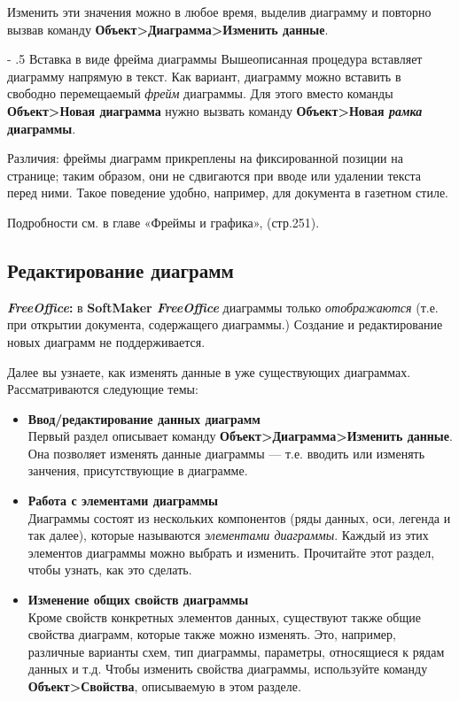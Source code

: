 \documentclass[a4paper,10pt]{article}
\makeatletter
\renewcommand\paragraph{%
   \@startsection{paragraph}{4}{0mm}%
      {-\baselineskip}%
      {.5\baselineskip}%
      {\normalfont\normalsize\bfseries}}
\makeatother
\begin{document}
 Изменить эти значения можно в любое время, выделив диаграмму и повторно вызвав команду \textbf{Объект>Диаграмма>Изменить данные}.
 
 \paragraph{Вставка в виде фрейма диаграммы}
 Вышеописанная процедура вставляет диаграмму напрямую в текст. Как вариант, диаграмму можно вставить в свободно перемещаемый \textit{фрейм} диаграммы. Для этого вместо команды \textbf{Объект>Новая диаграмма} нужно вызвать команду \textbf{Объект>Новая \textit{рамка} диаграммы}.
 
Различия: фреймы диаграмм прикреплены на фиксированной позиции на странице; таким образом, они не сдвигаются при вводе или удалении текста перед ними. Такое поведение удобно, например, для документа в газетном стиле.

Подробности см. в главе «Фреймы и графика», (стр.251).
 
 \subsection{Редактирование диаграмм}
 \begin{mdframed}[backgroundcolor=pink!50]
\textbf{\textit{FreeOffice}:} в \textbf{SoftMaker \textit{FreeOffice}} диаграммы только \textit{отображаются} (т.е. при открытии документа, содержащего диаграммы.) Создание и редактирование новых диаграмм не поддерживается.
\end{mdframed}

Далее вы узнаете, как изменять данные в уже существующих диаграммах. Рассматриваются следующие темы:

\begin{itemize}
 \item \textbf{Ввод/редактирование данных диаграмм}\\
 Первый раздел описывает команду \textbf{Объект>Диаграмма>Изменить данные}. Она позволяет изменять данные диаграммы --- т.е. вводить или изменять занчения, присутствующие в диаграмме.
 \item \textbf{Работа с элементами диаграммы}\\
 Диаграммы состоят из нескольких компонентов (ряды данных, оси, легенда и так далее), которые называются \textit{элементами диаграммы}. Каждый из этих элементов диаграммы можно выбрать и изменить. Прочитайте этот раздел, чтобы узнать, как это сделать.
 \item \textbf{Изменение общих свойств диаграммы}\\
 Кроме свойств конкретных элементов данных, существуют также общие свойства диаграмм, которые также можно изменять. Это, например, различные варианты схем, тип диаграммы, параметры, относящиеся к рядам данных и т.д. Чтобы изменить свойства диаграммы, используйте команду \textbf{Объект>Свойства}, описываемую в этом разделе.
\end{itemize}
\end{document}

